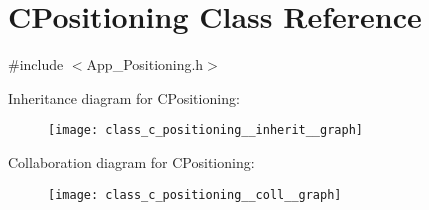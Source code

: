 \hypertarget{class_c_positioning}{}\section{C\+Positioning Class Reference}
\label{class_c_positioning}


{\ttfamily \#include $<$App\+\_\+\+Positioning.\+h$>$}



Inheritance diagram for C\+Positioning\+:\nopagebreak
\begin{figure}[H]
\begin{center}
\leavevmode
\texttt{[image: class\_c\_positioning\_\_inherit\_\_graph]}
\end{center}
\end{figure}


Collaboration diagram for C\+Positioning\+:\nopagebreak
\begin{figure}[H]
\begin{center}
\leavevmode
\texttt{[image: class\_c\_positioning\_\_coll\_\_graph]}
\end{center}
\end{figure}
